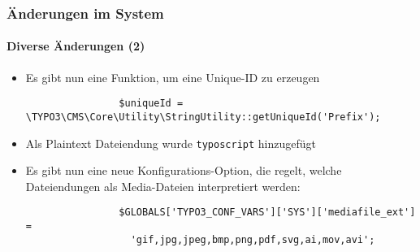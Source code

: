 \begin{frame}[fragile]
	\frametitle{Änderungen im System}
	\framesubtitle{Diverse Änderungen (2)}


	\begin{itemize}

		\item Es gibt nun eine Funktion, um eine Unique-ID zu erzeugen

			\begin{lstlisting}
				$uniqueId = \TYPO3\CMS\Core\Utility\StringUtility::getUniqueId('Prefix');
			\end{lstlisting}

		\item Als Plaintext Dateiendung wurde \texttt{typoscript} hinzugefügt

		\item Es gibt nun eine neue Konfigurations-Option, die regelt, welche Dateiendungen
			als Media-Dateien interpretiert werden:

			\begin{lstlisting}
				$GLOBALS['TYPO3_CONF_VARS']['SYS']['mediafile_ext'] =
				  'gif,jpg,jpeg,bmp,png,pdf,svg,ai,mov,avi';
			\end{lstlisting}

	\end{itemize}

	\breakingchange

\end{frame}

